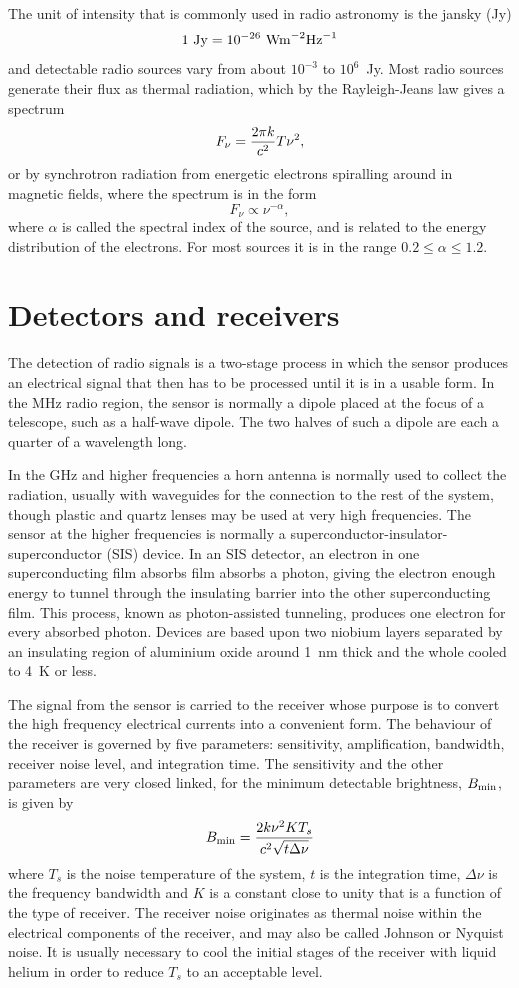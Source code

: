 The unit of intensity that is commonly used in radio astronomy is the 
jansky (Jy)
\[
1~{\rm Jy}=10^{-26}~{\rm W m}^{-2}{\rm Hz}^{-1}
\]
and detectable radio sources vary from about $10^{-3}$ to $10^6$~Jy. Most
radio sources generate their flux as thermal radiation, which by the 
Rayleigh-Jeans law gives a spectrum
\[
F_\nu={2\pi k\over c^2}T\nu^2,
\]
or by synchrotron radiation from energetic electrons spiralling around
in magnetic fields, where the spectrum is in the form
\[
F_\nu\propto\nu^{-\alpha},
\]
where $\alpha$ is called the spectral index of the source, and is related
to the energy distribution of the electrons. For most sources it is in the
range $0.2\le \alpha\le 1.2$.

\section{Detectors and receivers}

The detection of radio signals is a two-stage process in which the sensor
produces an electrical signal that then has to be processed until it is in
a usable form. In the MHz radio region, the sensor is normally a dipole 
placed at the focus of a telescope, such as a half-wave dipole. The two halves
of such a dipole are each a quarter of a wavelength long. 

In the GHz and higher frequencies a horn antenna is normally used to collect 
the radiation, usually with waveguides for the connection to the rest of the 
system, though plastic and quartz lenses may be used at very high frequencies.
The sensor at the higher frequencies is normally a 
superconductor-insulator-superconductor (SIS) device. In an SIS detector, an
electron in one superconducting film absorbs film absorbs a photon, giving the
electron enough energy to tunnel through the insulating barrier into the other
superconducting film. This process, known as photon-assisted tunneling, 
produces one electron for every absorbed photon. Devices are based upon two
niobium layers separated by an insulating region of aluminium oxide around
1~nm thick and the whole cooled to 4~K or less.

The signal from the sensor is carried to the receiver whose purpose is 
to convert the high frequency electrical currents into a convenient form.
The behaviour of the receiver is governed by five parameters: sensitivity,
amplification, bandwidth, receiver noise level, and integration time. The
sensitivity and the other parameters are very closed linked, for the minimum
detectable brightness, $B_{\rm min}$, is given by
\[
B_{\rm min}={2k\nu^2KT_s\over c^2\sqrt{t\Delta\nu}}
\]
where $T_s$ is the noise temperature of the system, $t$ is the integration 
time, $\Delta\nu$ is the frequency bandwidth and $K$ is a constant close to 
unity that is a function of the type of receiver. The receiver noise originates
as thermal noise within the electrical components of the receiver, and may also
be called Johnson or Nyquist noise. It is usually necessary to cool the initial
stages of the receiver with liquid helium in order to reduce $T_s$ to an 
acceptable level.



